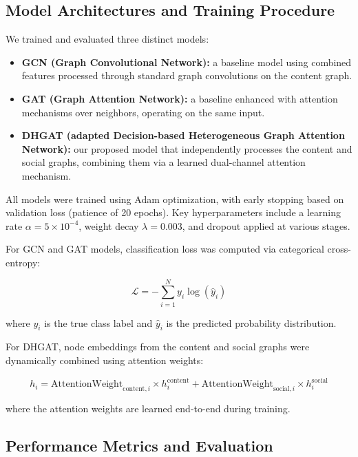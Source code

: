 \subsection{Model Architectures and Training Procedure}

We trained and evaluated three distinct models:

\begin{itemize}
    \item \textbf{GCN (Graph Convolutional Network):} a baseline model using combined features processed through standard graph convolutions on the content graph.
    \item \textbf{GAT (Graph Attention Network):} a baseline enhanced with attention mechanisms over neighbors, operating on the same input.
    \item \textbf{DHGAT (adapted Decision-based Heterogeneous Graph Attention Network):} our proposed model that independently processes the content and social graphs, combining them via a learned dual-channel attention mechanism.
\end{itemize}

All models were trained using Adam optimization, with early stopping based on validation loss (patience of 20 epochs). Key hyperparameters include a learning rate $\alpha=5 \times 10^{-4}$, weight decay $\lambda=0.003$, and dropout applied at various stages.

For GCN and GAT models, classification loss was computed via categorical cross-entropy:

\begin{equation}
\mathcal{L} = -\sum_{i=1}^{N} y_i \log(\hat{y}_i)
\end{equation}

where $y_i$ is the true class label and $\hat{y}_i$ is the predicted probability distribution.

For DHGAT, node embeddings from the content and social graphs were dynamically combined using attention weights:

\begin{equation}
h_i = \text{AttentionWeight}_{\text{content},i} \times h^{\text{content}}_i + \text{AttentionWeight}_{\text{social},i} \times h^{\text{social}}_i
\end{equation}

where the attention weights are learned end-to-end during training.

\subsection{Performance Metrics and Evaluation}

